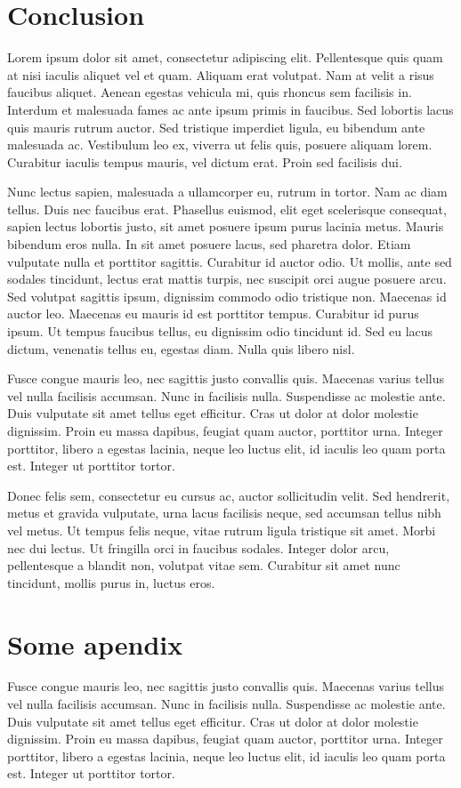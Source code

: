 \documentclass{./styles/UoYCSproject}
\begin{document}
\chapter{Conclusion}
\label{cha:conclusion}
Lorem ipsum dolor sit amet, consectetur adipiscing elit. Pellentesque quis quam at nisi iaculis aliquet vel et quam. Aliquam erat volutpat. Nam at velit a risus faucibus aliquet. Aenean egestas vehicula mi, quis rhoncus sem facilisis in. Interdum et malesuada fames ac ante ipsum primis in faucibus. Sed lobortis lacus quis mauris rutrum auctor. Sed tristique imperdiet ligula, eu bibendum ante malesuada ac. Vestibulum leo ex, viverra ut felis quis, posuere aliquam lorem. Curabitur iaculis tempus mauris, vel dictum erat. Proin sed facilisis dui.

Nunc lectus sapien, malesuada a ullamcorper eu, rutrum in tortor. Nam ac diam tellus. Duis nec faucibus erat. Phasellus euismod, elit eget scelerisque consequat, sapien lectus lobortis justo, sit amet posuere ipsum purus lacinia metus. Mauris bibendum eros nulla. In sit amet posuere lacus, sed pharetra dolor. Etiam vulputate nulla et porttitor sagittis. Curabitur id auctor odio. Ut mollis, ante sed sodales tincidunt, lectus erat mattis turpis, nec suscipit orci augue posuere arcu. Sed volutpat sagittis ipsum, dignissim commodo odio tristique non. Maecenas id auctor leo. Maecenas eu mauris id est porttitor tempus. Curabitur id purus ipsum. Ut tempus faucibus tellus, eu dignissim odio tincidunt id. Sed eu lacus dictum, venenatis tellus eu, egestas diam. Nulla quis libero nisl.

Fusce congue mauris leo, nec sagittis justo convallis quis. Maecenas varius tellus vel nulla facilisis accumsan. Nunc in facilisis nulla. Suspendisse ac molestie ante. Duis vulputate sit amet tellus eget efficitur. Cras ut dolor at dolor molestie dignissim. Proin eu massa dapibus, feugiat quam auctor, porttitor urna. Integer porttitor, libero a egestas lacinia, neque leo luctus elit, id iaculis leo quam porta est. Integer ut porttitor tortor.

Donec felis sem, consectetur eu cursus ac, auctor sollicitudin velit. Sed hendrerit, metus et gravida vulputate, urna lacus facilisis neque, sed accumsan tellus nibh vel metus. Ut tempus felis neque, vitae rutrum ligula tristique sit amet. Morbi nec dui lectus. Ut fringilla orci in faucibus sodales. Integer dolor arcu, pellentesque a blandit non, volutpat vitae sem. Curabitur sit amet nunc tincidunt, mollis purus in, luctus eros.

\appendix
\chapter{Some apendix}
Fusce congue mauris leo, nec sagittis justo convallis quis. Maecenas varius tellus vel nulla facilisis accumsan. Nunc in facilisis nulla. Suspendisse ac molestie ante. Duis vulputate sit amet tellus eget efficitur. Cras ut dolor at dolor molestie dignissim. Proin eu massa dapibus, feugiat quam auctor, porttitor urna. Integer porttitor, libero a egestas lacinia, neque leo luctus elit, id iaculis leo quam porta est. Integer ut porttitor tortor.
\end{document}
